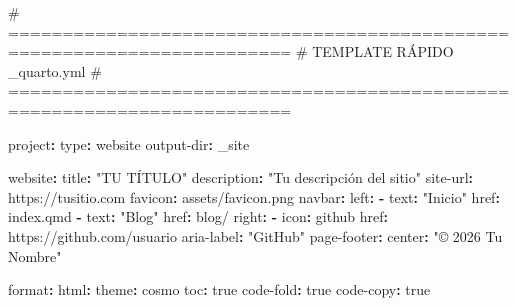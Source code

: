 \documentclass[
  doc,
  floatsintext,
  longtable,
  a4paper,
  nolmodern,
  notxfonts,
  notimes,
  12pt,
  colorlinks=true,linkcolor=blue,citecolor=blue,urlcolor=blue]{apa7}
\newenvironment{Shaded}{\begin{snugshade}}{\end{snugshade}}
\newcommand{\AttributeTok}[1]{\textcolor[rgb]{0.40,0.45,0.13}{#1}}
\newcommand{\CharTok}[1]{\textcolor[rgb]{0.13,0.47,0.30}{#1}}
\newcommand{\CommentTok}[1]{\textcolor[rgb]{0.37,0.37,0.37}{#1}}
\newcommand{\FunctionTok}[1]{\textcolor[rgb]{0.28,0.35,0.67}{#1}}
\newcommand{\KeywordTok}[1]{\textcolor[rgb]{0.00,0.23,0.31}{\textbf{#1}}}
\newcommand{\StringTok}[1]{\textcolor[rgb]{0.13,0.47,0.30}{#1}}
\begin{document}
\begin{Shaded}
\begin{Highlighting}[]
\CommentTok{\# ========================================================================}
\CommentTok{\# TEMPLATE RÁPIDO \_quarto.yml}
\CommentTok{\# ========================================================================}

\FunctionTok{project}\KeywordTok{:}
\AttributeTok{  }\FunctionTok{type}\KeywordTok{:}\AttributeTok{ website}
\AttributeTok{  }\FunctionTok{output{-}dir}\KeywordTok{:}\AttributeTok{ \_site}

\FunctionTok{website}\KeywordTok{:}
\AttributeTok{  }\FunctionTok{title}\KeywordTok{:}\AttributeTok{ }\StringTok{"TU TÍTULO"}
\AttributeTok{  }\FunctionTok{description}\KeywordTok{:}\AttributeTok{ }\StringTok{"Tu descripción del sitio"}
\AttributeTok{  }\FunctionTok{site{-}url}\KeywordTok{:}\AttributeTok{ https://tusitio.com}
\AttributeTok{  }\FunctionTok{favicon}\KeywordTok{:}\AttributeTok{ assets/favicon.png}
\AttributeTok{  }
\AttributeTok{  }\FunctionTok{navbar}\KeywordTok{:}
\AttributeTok{    }\FunctionTok{left}\KeywordTok{:}
\AttributeTok{      }\KeywordTok{{-}}\AttributeTok{ }\FunctionTok{text}\KeywordTok{:}\AttributeTok{ }\StringTok{"Inicio"}
\AttributeTok{        }\FunctionTok{href}\KeywordTok{:}\AttributeTok{ index.qmd}
\AttributeTok{      }\KeywordTok{{-}}\AttributeTok{ }\FunctionTok{text}\KeywordTok{:}\AttributeTok{ }\StringTok{"Blog"}
\AttributeTok{        }\FunctionTok{href}\KeywordTok{:}\AttributeTok{ blog/}
\AttributeTok{    }\FunctionTok{right}\KeywordTok{:}
\AttributeTok{      }\KeywordTok{{-}}\AttributeTok{ }\FunctionTok{icon}\KeywordTok{:}\AttributeTok{ github}
\AttributeTok{        }\FunctionTok{href}\KeywordTok{:}\AttributeTok{ https://github.com/usuario}
\AttributeTok{        }\FunctionTok{aria{-}label}\KeywordTok{:}\AttributeTok{ }\StringTok{"GitHub"}
\AttributeTok{  }
\AttributeTok{  }\FunctionTok{page{-}footer}\KeywordTok{:}
\AttributeTok{    }\FunctionTok{center}\KeywordTok{:}\AttributeTok{ }\StringTok{"© 2026 Tu Nombre"}

\FunctionTok{format}\KeywordTok{:}
\AttributeTok{  }\FunctionTok{html}\KeywordTok{:}
\AttributeTok{    }\FunctionTok{theme}\KeywordTok{:}\AttributeTok{ cosmo}
\AttributeTok{    }\FunctionTok{toc}\KeywordTok{:}\AttributeTok{ }\CharTok{true}
\AttributeTok{    }\FunctionTok{code{-}fold}\KeywordTok{:}\AttributeTok{ }\CharTok{true}
\AttributeTok{    }\FunctionTok{code{-}copy}\KeywordTok{:}\AttributeTok{ }\CharTok{true}
\end{Highlighting}
\end{Shaded}
\end{document}
